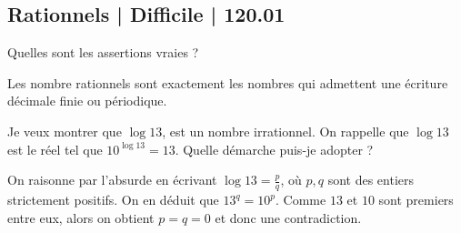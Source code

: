 \subsection{Rationnels | Difficile | 120.01}

\begin{question}

Quelles sont les assertions vraies ?
\begin{answers}



   
\end{answers}
\begin{explanations}
Les nombre rationnels sont exactement les nombres qui admettent une écriture décimale finie ou périodique.
\end{explanations}
\end{question}


\begin{question}

Je veux montrer que $\log 13$, est un nombre irrationnel. On rappelle que $\log 13$ est le réel tel que $10^{\log 13} = 13$. Quelle démarche puis-je adopter ?
\begin{answers}




\end{answers}
\begin{explanations}
On raisonne par l'absurde en écrivant $\log 13 = \frac pq$, où $p,q$ sont des entiers strictement positifs. On en déduit que $13^q = 10^p$. Comme $13$ et $10$ sont premiers entre eux, alors on obtient $p=q=0$ et donc une contradiction.
\end{explanations}
\end{question}

